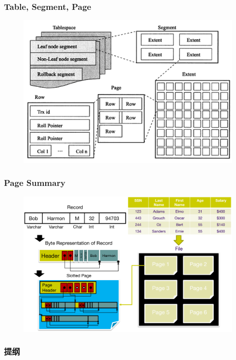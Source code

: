 \begin{frame}[fragile]
	\frametitle{Table, Segment, Page}
	\begin{figure}
		\includegraphics[width=.68\linewidth]{figs/dbfile-table-seg-page2.png}
	\end{figure}
\end{frame}


\begin{frame}[fragile]
	\frametitle{Page Summary}
	\begin{figure}
		\includegraphics[width=.68\linewidth]{figs/dbfile-page-summary.pdf}
	\end{figure}
\end{frame}

\begin{frame}
\frametitle{提纲} %
\tableofcontents %

\end{frame}

